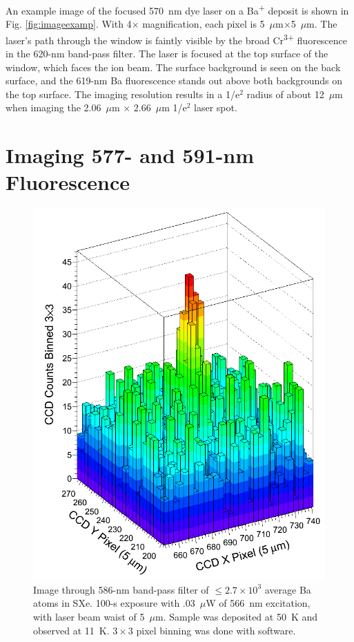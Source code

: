 An example image of the focused 570~nm dye laser on a Ba\textsuperscript{+} deposit is shown in Fig. \ref{fig:imageexamp}.  With 4$\times$ magnification, each pixel is 5~$\mu$m$\times$5~$\mu$m.  The laser's path through the window is faintly visible by the broad Cr\textsuperscript{3+} fluorescence in the 620-nm band-pass filter.  The laser is focused at the top surface of the window, which faces the ion beam.  The surface background is seen on the back surface, and the 619-nm Ba fluorescence stands out above both backgrounds on the top surface.  The imaging resolution results in a 1/e$^{2}$ radius of about 12~$\mu$m when imaging the 2.06~$\mu$m $\times$ 2.66~$\mu$m 1/e$^{2}$ laser spot.




\section{Imaging 577- and 591-nm Fluorescence}
\label{sec:imaging590and577}

\begin{figure} %
        \centering
                \includegraphics[width=.6\textwidth]{figures/image_1e4.png}
                \caption{Image through 586-nm band-pass filter of $\leq 2.7 \times 10^{3}$ average Ba atoms in SXe.  100-s exposure with .03~$\mu$W of 566~nm excitation, with laser beam waist of 5~$\mu$m.  Sample was deposited at 50~K and observed at 11~K.  $3 \times 3$ pixel binning was done with software.}
\label{fig:image590s}
\end{figure}

